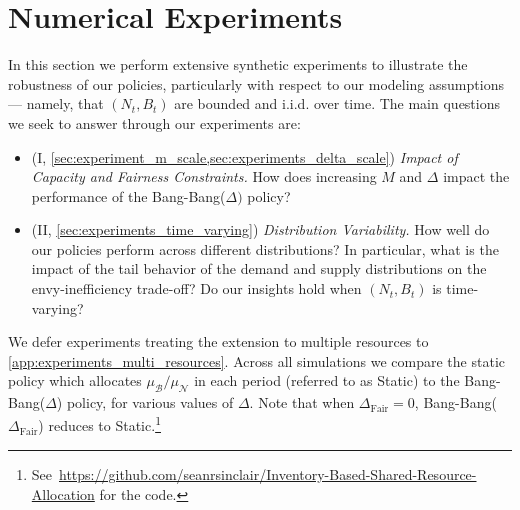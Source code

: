\documentclass[mnsc,nonblindrev]{informs3}
\newcommand{\NDist}{\mathcal{N}}
\newcommand{\BDist}{\mathcal{B}}
\newcommand{\Nmean}{\mu_{\NDist}}
\newcommand{\Bmean}{\mu_{\BDist}}
\newcommand{\ALG}{{Bang-Bang}\xspace}
\newcommand{\Static}{\textsf{Static}\xspace}
\newcommand{\Dfair}{\Delta_{\text{Fair}}\xspace}
\begin{document}
\section{Numerical Experiments}
\label{sec:simulations}

In this section we perform extensive synthetic experiments to illustrate the robustness of our policies, particularly with respect to our modeling assumptions --- namely, that $(N_t, B_t)$ are bounded and i.i.d. over time.
The main questions we seek to answer through our experiments are:
\begin{itemize}[nosep,leftmargin=0.5cm]
    \item {(I, \cref{sec:experiment_m_scale,sec:experiments_delta_scale})} {\em Impact of Capacity and Fairness Constraints.} How does increasing $M$ and $\Delta$ impact the performance of the \ALG($\Delta)$ policy?
    \item {(II, \cref{sec:experiments_time_varying})} {\em Distribution Variability.}  How well do our policies perform across different distributions? In particular, what is the impact of the tail behavior of the demand and supply distributions on the envy-inefficiency trade-off?
    Do our insights hold when $(N_t, B_t)$ is time-varying?
\end{itemize}
We defer experiments treating the extension to multiple resources to \cref{app:experiments_multi_resources}.
Across all simulations we compare the static policy which allocates $\Bmean/\Nmean$ in each period (referred to as \Static) to the \ALG($\Delta$) policy, for various values of $\Delta$.  {Note that when $\Dfair=0$, \ALG($\Dfair$) reduces to \Static.}\footnote{See~\url{https://github.com/seanrsinclair/Inventory-Based-Shared-Resource-Allocation} for the code.} 
\end{document}
